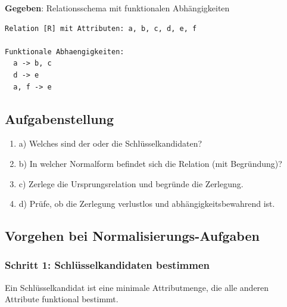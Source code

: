 \documentclass[a4paper]{article}
\begin{document}
\textbf{Gegeben}: Relationsschema mit funktionalen Abhängigkeiten

\begin{lstlisting}
Relation [R] mit Attributen: a, b, c, d, e, f

Funktionale Abhaengigkeiten:
  a -> b, c
  d -> e
  a, f -> e
\end{lstlisting}

\subsection{Aufgabenstellung}

\begin{enumerate}
    \item a) Welches sind der oder die Schlüsselkandidaten?
    \item b) In welcher Normalform befindet sich die Relation (mit Begründung)?
    \item c) Zerlege die Ursprungsrelation und begründe die Zerlegung.
    \item d) Prüfe, ob die Zerlegung verlustlos und abhängigkeitsbewahrend ist.
\end{enumerate}

\subsection{Vorgehen bei Normalisierungs-Aufgaben}

\subsubsection{Schritt 1: Schlüsselkandidaten bestimmen}

Ein Schlüsselkandidat ist eine minimale Attributmenge, die alle anderen Attribute funktional bestimmt.
\end{document}
